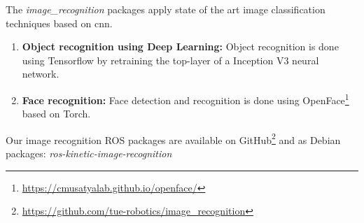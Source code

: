 The \emph{image\_recognition} packages apply state of the art image classification techniques based on \acrfull{cnn}.
\begin{enumerate}

\item \textbf{Object recognition using Deep Learning:} Object recognition is done using Tensorflow\texttrademark\hspace{0em} by retraining the top-layer of a Inception V3 neural network.

\item \textbf{Face recognition:} Face detection and recognition is done using OpenFace\footnote{\url{https://cmusatyalab.github.io/openface/}} based on Torch.
\end{enumerate}
Our image recognition ROS packages are available on GitHub\footnote{\url{https://github.com/tue-robotics/image_recognition}} and as Debian packages: \emph{ros-kinetic-image-recognition}
